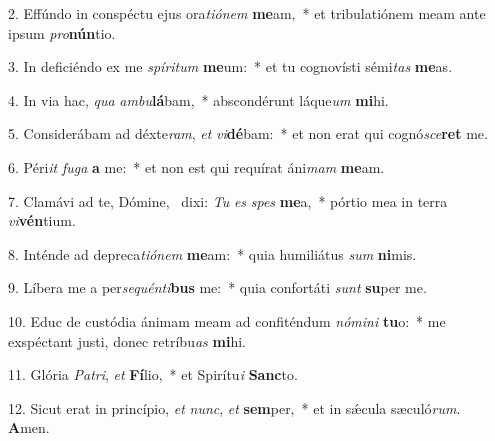 2. Effúndo in conspéctu ejus ora\textit{ti}\textit{ó}\textit{nem} \textbf{me}am,~*  et tribulatiónem meam ante ipsum \textit{pro}\textbf{nún}tio.\

3. In deficiéndo ex me \textit{spí}\textit{ri}\textit{tum} \textbf{me}um:~*  et tu cognovísti sémi\textit{tas} \textbf{me}as.\

4. In via hac, \textit{qua} \textit{am}\textit{bu}\textbf{lá}bam,~*  abscondérunt láque\textit{um} \textbf{mi}hi.\

5. Considerábam ad déxte\textit{ram}, \textit{et} \textit{vi}\textbf{dé}bam:~*  et non erat qui cognó\textit{sce}\textbf{ret} me.\

6. Péri\textit{it} \textit{fu}\textit{ga} \textbf{a} me:~*  et non est qui requírat áni\textit{mam} \textbf{me}am.\

7. Clamávi ad te, Dómine, \dag\  dixi: \textit{Tu} \textit{es} \textit{spes} \textbf{me}a,~*  pórtio mea in terra \textit{vi}\textbf{vén}tium.\

8. Inténde ad depreca\textit{ti}\textit{ó}\textit{nem} \textbf{me}am:~*  quia humiliátus \textit{sum} \textbf{ni}mis.\

9. Líbera me a per\textit{se}\textit{quén}\textit{ti}\textbf{bus} me:~*  quia confortáti \textit{sunt} \textbf{su}per me.\

10. Educ de custódia ánimam meam ad confiténdum \textit{nó}\textit{mi}\textit{ni} \textbf{tu}o:~*  me exspéctant justi, donec retríbu\textit{as} \textbf{mi}hi.\

11. Glória \textit{Pa}\textit{tri}, \textit{et} \textbf{Fí}lio,~*  et Spirítu\textit{i} \textbf{Sanc}to.\

12. Sicut erat in princípio, \textit{et} \textit{nunc}, \textit{et} \textbf{sem}per,~*  et in sǽcula sæculó\textit{rum}. \textbf{A}men.\

